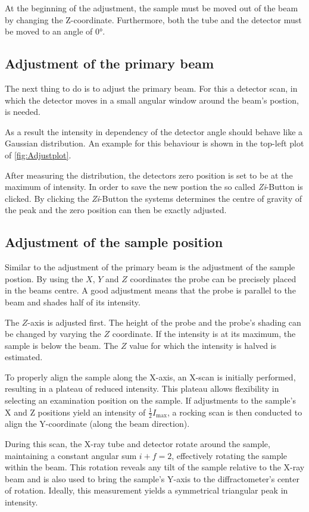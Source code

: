 At the beginning of the adjustment, the sample must be moved out of the beam by changing the Z-coordinate. Furthermore, both the tube and the detector must be moved to an angle of 0°.

\subsection{Adjustment of the primary beam}
The next thing to do is to adjust the primary beam. For this a detector scan, in which the detector moves in a small angular window around the beam's postion, is needed. 

As a result the intensity in dependency of the detector angle should behave like a Gaussian distribution. An example for this behaviour is shown in the top-left plot of \autoref{fig:Adjustplot}.

After measuring the distribution, the detectors zero position is set to be at the maximum of intensity. In order to save the new postion the so called \textit{Zi}-Button is clicked. By clicking the \textit{Zi}-Button the systems determines the centre of gravity of the peak and the zero position can then be exactly adjusted.
 
\subsection{Adjustment of the sample position}
Similar to the adjustment of the primary beam is the adjustment of the sample postion. By using the $X$, $Y$ and $Z$ coordinates the probe can be precisely placed in the beams centre. A good adjustment means that the probe is parallel to the beam and shades half of its intensity. 

The $Z$-axis is adjusted first. The height of the probe and the probe's shading can be changed by varying the $Z$ coordinate. If the intensity is at its maximum, the sample is below the beam. The $Z$ value for which the intensity is halved is estimated.

To properly align the sample along the X-axis, an X-scan is initially performed, resulting in a plateau of reduced intensity. This plateau allows flexibility in selecting an examination position on the sample. If adjustments to the sample’s X and Z positions yield an intensity of \( \frac{1}{2} I_{\text{max}} \), a rocking scan is then conducted to align the Y-coordinate (along the beam direction). 

During this scan, the X-ray tube and detector rotate around the sample, maintaining a constant angular sum \( i + f = 2 \), effectively rotating the sample within the beam. This rotation reveals any tilt of the sample relative to the X-ray beam and is also used to bring the sample's Y-axis to the diffractometer's center of rotation. Ideally, this measurement yields a symmetrical triangular peak in intensity. 

